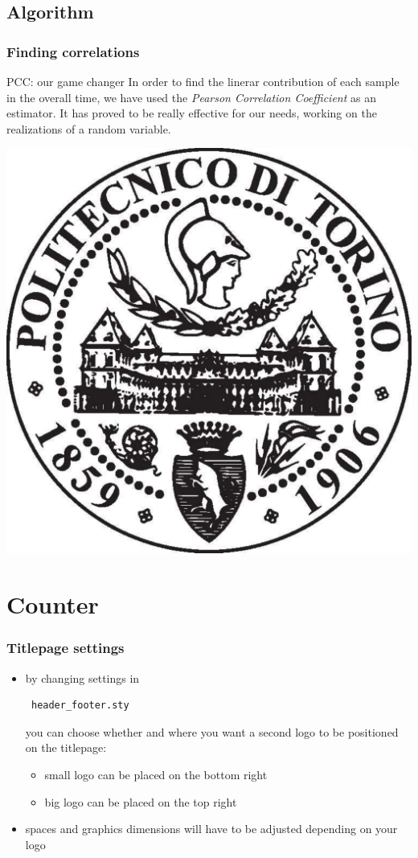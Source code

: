 \documentclass{beamer}
\begin{document}
\subsection{Algorithm}
\begin{frame}[fragile]
	\frametitle{Finding correlations}
	\begin{block}{PCC: our game changer}
		In order to find the linerar contribution of each sample in the overall time, we have used the \textit{Pearson Correlation Coefficient} as an estimator. It has proved to be really effective for our needs, working on the realizations of a random variable.
	\end{block}
	\begin{center}
		\includegraphics[]{./graphics/polito}
	\end{center}
\end{frame}


\section{Counter}

\begin{frame}[fragile]
\frametitle{Titlepage settings}
\begin{itemize}
\item by changing settings in \begin{verbatim} header_footer.sty \end{verbatim} you can choose whether and where you want a second logo to be positioned on the titlepage:
\begin{itemize}
\item small logo can be placed on the bottom right
\item big logo can be placed on the top right
\end{itemize}
\item spaces and graphics dimensions will have to be adjusted depending on your logo
\end{itemize}
\end{frame}
\end{document}
